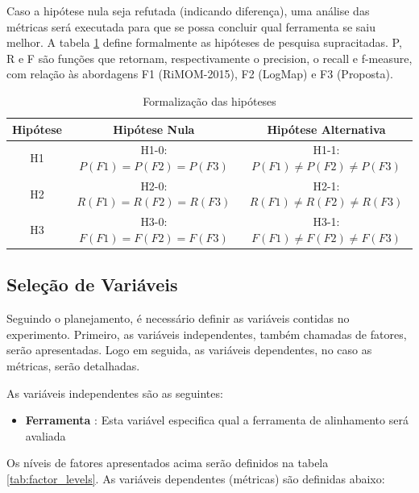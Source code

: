 Caso a hipótese nula seja refutada (indicando diferença), uma análise das métricas será executada para que se possa concluir qual ferramenta se saiu melhor.
A tabela \ref{tab:hypothesis} define formalmente as hipóteses de pesquisa supracitadas. P, R e F são funções que retornam, respectivamente o precision, o recall e f-measure, com relação às abordagens F1 (RiMOM-2015), F2 (LogMap) e F3 (Proposta).

\begin{table}[h]
\centering
\caption{Formalização das hipóteses}
\label{tab:hypothesis}
\begin{tabular}{|c|c|c|}
\hline
Hipótese & Hipótese Nula & Hipótese Alternativa \\ \hline
H1       & H1-0:$ P(F1) = P(F2) = P(F3) $ & H1-1:$ P(F1) \not= P(F2) \not= P(F3) $                    \\ \hline
H2       & H2-0:$ R(F1) = R(F2) = R(F3) $ & H2-1:$ R(F1) \not= R(F2) \not= R(F3) $                    \\ \hline
H3       & H3-0:$ F(F1) = F(F2) = F(F3) $ & H3-1:$ F(F1) \not= F(F2) \not= F(F3) $                    \\ \hline
\end{tabular}
\end{table}

\subsection*{Seleção de Variáveis}
Seguindo o planejamento, é necessário definir as variáveis contidas no experimento. Primeiro, as variáveis independentes, também chamadas de fatores, serão apresentadas. Logo em seguida, as variáveis dependentes, no caso as métricas, serão detalhadas.

As variáveis independentes são as seguintes:
\begin{itemize}
\item \textbf{Ferramenta} : Esta variável especifica qual a ferramenta de alinhamento será avaliada
\end{itemize}

Os níveis de fatores apresentados acima serão definidos na tabela \ref{tab:factor_levels}. As variáveis dependentes (métricas) são definidas abaixo:


